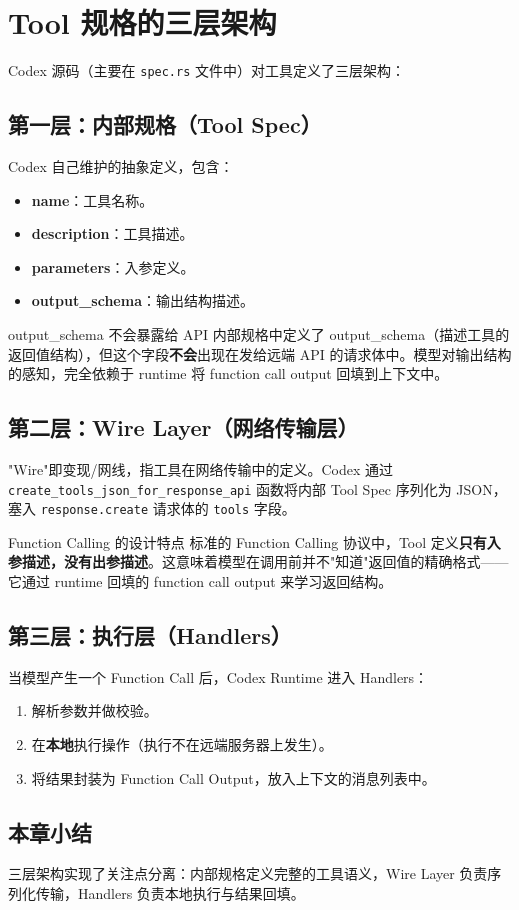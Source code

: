 \section{Tool 规格的三层架构}

Codex 源码（主要在 \texttt{spec.rs} 文件中）对工具定义了三层架构：

\subsection{第一层：内部规格（Tool Spec）}

Codex 自己维护的抽象定义，包含：
\begin{itemize}
    \item \textbf{name}：工具名称。
    \item \textbf{description}：工具描述。
    \item \textbf{parameters}：入参定义。
    \item \textbf{output\_schema}：输出结构描述。
\end{itemize}

\begin{warningbox}{output\_schema 不会暴露给 API}
内部规格中定义了 output\_schema（描述工具的返回值结构），但这个字段\textbf{不会}出现在发给远端 API 的请求体中。模型对输出结构的感知，完全依赖于 runtime 将 function call output 回填到上下文中。
\end{warningbox}

\subsection{第二层：Wire Layer（网络传输层）}

"Wire"即变现/网线，指工具在网络传输中的定义。Codex 通过 \texttt{create\_tools\_json\_for\_response\_api} 函数将内部 Tool Spec 序列化为 JSON，塞入 \texttt{response.create} 请求体的 \texttt{tools} 字段。

\begin{knowledgebox}{Function Calling 的设计特点}
标准的 Function Calling 协议中，Tool 定义\textbf{只有入参描述，没有出参描述}。这意味着模型在调用前并不"知道"返回值的精确格式——它通过 runtime 回填的 function call output 来学习返回结构。
\end{knowledgebox}

\subsection{第三层：执行层（Handlers）}

当模型产生一个 Function Call 后，Codex Runtime 进入 Handlers：
\begin{enumerate}
    \item 解析参数并做校验。
    \item 在\textbf{本地}执行操作（执行不在远端服务器上发生）。
    \item 将结果封装为 Function Call Output，放入上下文的消息列表中。
\end{enumerate}

\subsection{本章小结}

三层架构实现了关注点分离：内部规格定义完整的工具语义，Wire Layer 负责序列化传输，Handlers 负责本地执行与结果回填。


